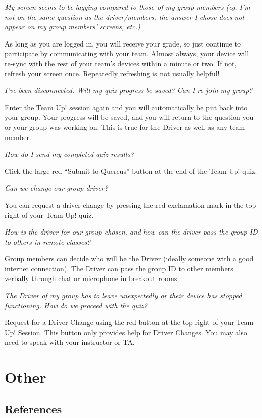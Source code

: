 \documentclass[
  openany]{book}
\begin{document}
\emph{My screen seems to be lagging compared to those of my group members (eg. I'm not on the same question as the driver/members, the answer I chose does not appear on my group members' screens, etc.)}

As long as you are logged in, you will receive your grade, so just continue to participate by communicating with your team. Almost always, your device will re-sync with the rest of your team's devices within a minute or two. If not, refresh your screen once. Repeatedly refreshing is not usually helpful!

\emph{I've been disconnected. Will my quiz progress be saved? Can I re-join my group?}

Enter the Team Up! session again and you will automatically be put back into your group. Your progress will be saved, and you will return to the question you or your group was working on. This is true for the Driver as well as any team member.

\emph{How do I send my completed quiz results?}

Click the large red ``Submit to Quercus'' button at the end of the Team Up! quiz.

\emph{Can we change our group driver?}

You can request a driver change by pressing the red exclamation mark in the top right of your Team Up! quiz.

\emph{How is the driver for our group chosen, and how can the driver pass the group ID to others in remote classes?}

Group members can decide who will be the Driver (ideally someone with a good internet connection). The Driver can pass the group ID to other members verbally through chat or microphone in breakout rooms.

\emph{The Driver of my group has to leave unexpectedly or their device has stopped functioning. How do we proceed with the quiz?}

Request for a Driver Change using the red button at the top right of your Team Up! Session. This button only provides help for Driver Changes. You may also need to speak with your instructor or TA.

\hypertarget{other}{%
\section{Other}\label{other}}

\hypertarget{references-1}{%
\subsection{References}\label{references-1}}
\end{document}

